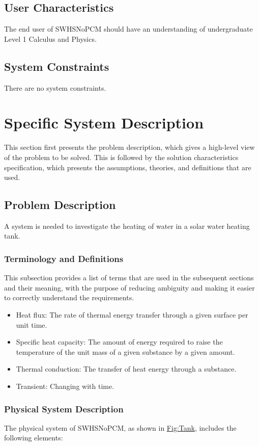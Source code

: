 \documentclass[12pt]{article}
\begin{document}
\subsection{User Characteristics}
\label{Sec:UserChars}
The end user of SWHSNoPCM should have an understanding of undergraduate Level 1 Calculus and Physics.

\subsection{System Constraints}
\label{Sec:SysConstraints}
There are no system constraints.

\section{Specific System Description}
\label{Sec:SpecSystDesc}
This section first presents the problem description, which gives a high-level view of the problem to be solved. This is followed by the solution characteristics specification, which presents the assumptions, theories, and definitions that are used.

\subsection{Problem Description}
\label{Sec:ProbDesc}
A system is needed to investigate the heating of water in a solar water heating tank.

\subsubsection{Terminology and Definitions}
\label{Sec:TermDefs}
This subsection provides a list of terms that are used in the subsequent sections and their meaning, with the purpose of reducing ambiguity and making it easier to correctly understand the requirements.

\begin{itemize}
\item{Heat flux: The rate of thermal energy transfer through a given surface per unit time.}
\item{Specific heat capacity: The amount of energy required to raise the temperature of the unit mass of a given substance by a given amount.}
\item{Thermal conduction: The transfer of heat energy through a substance.}
\item{Transient: Changing with time.}
\end{itemize}
\subsubsection{Physical System Description}
\label{Sec:PhysSyst}
The physical system of SWHSNoPCM, as shown in \hyperref[Figure:Tank]{Fig:Tank}, includes the following elements:
\end{document}
